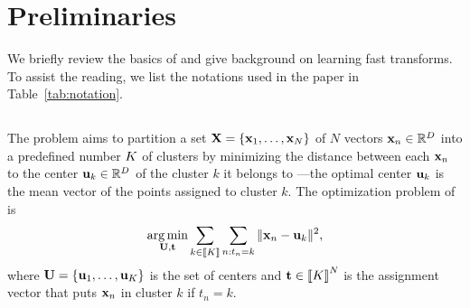 
\section{Preliminaries}
\label{sec:background}
We briefly review the basics of \kmeans and give background on learning fast transforms.
To  assist  the  reading,  we  list  the notations used in the paper in Table~\ref{tab:notation}.









\subsection{\kmeans}
\label{sec:kmeans}
The \kmeans problem aims to partition a set ${\mathbf{X}}=\{{\mathbf{x}}_1,\ldots,{\mathbf{x}}_N\}$ of $N$  vectors ${\mathbf{x}}_n\in\mathbb{R}^{D}$ into a predefined number $K$ of clusters
by minimizing the distance between each ${\mathbf{x}}_n$ to the center ${\mathbf{u}}_k\in\mathbb{R}^{D}$
of the cluster $k$ it belongs to ---the optimal center ${\mathbf{u}}_k$ is the
 mean vector of the points assigned to cluster $k$.
The optimization problem of \kmeans is
\begin{equation}
\label{eq:kmean_problem}
    \operatorname*{arg\,min}_{{\mathbf{U}}, {\mathbf{t}}} \sum_{k\in\left \llbracket K\right \rrbracket} \sum_{n:t_n = k} \|{\mathbf{x}}_{n} -{\mathbf{u}}_{k}\|^2,
\end{equation}
where ${\mathbf{U}}=\{{\mathbf{u}}_1,\ldots,{\mathbf{u}}_K\}$ is the set of centers and ${\mathbf{t}} \in  \left \llbracket K\right \rrbracket^{N}$ is the assignment vector that puts ${\mathbf{x}}_n$ in cluster $k$
if $t_n=k$.


